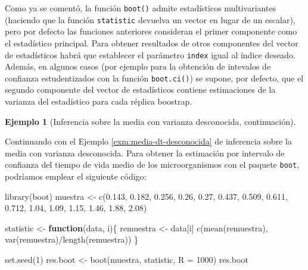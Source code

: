 \documentclass[
]{book}
\newenvironment{Shaded}{\begin{snugshade}}{\end{snugshade}}
\newcommand{\AttributeTok}[1]{\textcolor[rgb]{0.77,0.63,0.00}{#1}}
\newcommand{\ControlFlowTok}[1]{\textcolor[rgb]{0.13,0.29,0.53}{\textbf{#1}}}
\newcommand{\DecValTok}[1]{\textcolor[rgb]{0.00,0.00,0.81}{#1}}
\newcommand{\FloatTok}[1]{\textcolor[rgb]{0.00,0.00,0.81}{#1}}
\newcommand{\FunctionTok}[1]{\textcolor[rgb]{0.00,0.00,0.00}{#1}}
\newcommand{\NormalTok}[1]{#1}
\newcommand{\OtherTok}[1]{\textcolor[rgb]{0.56,0.35,0.01}{#1}}
\newcommand{\SpecialCharTok}[1]{\textcolor[rgb]{0.00,0.00,0.00}{#1}}
\theoremstyle{break}
\theoremstyle{definition}
\theoremstyle{definition}
\newtheorem{example}{Ejemplo}[chapter]
\theoremstyle{definition}
\theoremstyle{definition}
\theoremstyle{remark}
\begin{document}
Como ya se comentó, la función \texttt{boot()} admite estadísticos multivariantes
(haciendo que la función \texttt{statistic} devuelva un vector en lugar de un escalar),
pero por defecto las funciones anteriores consideran el primer componente
como el estadístico principal.
Para obtener resultados de otros componentes del vector de estadísticos
habrá que establecer el parámetro \texttt{index} igual al índice deseado.
Además, en algunos casos (por ejemplo para la obtención de intevalos de confianza
estudentizados con la función \texttt{boot.ci()}) se supone, por defecto, que el segundo
componente del vector de estadísticos contiene estimaciones de la varianza del
estadístico para cada réplica boostrap.

\begin{example}[Inferencia sobre la media con varianza desconocida, continuación]
\protect\hypertarget{exm:media-dt-desconocida-boot}{}{\label{exm:media-dt-desconocida-boot} \iffalse (Inferencia sobre la media con varianza desconocida, continuación) \fi{} } \vspace{0.5cm}

Continuando con el Ejemplo \ref{exm:media-dt-desconocida} de
inferencia sobre la media con varianza desconocida.
Para obtener la estimación por intervalo de confianza del tiempo de vida medio
de los microorganismos con el paquete \texttt{boot}, podríamos emplear
el siguiente código:
\end{example}

\begin{Shaded}
\begin{Highlighting}[]
\FunctionTok{library}\NormalTok{(boot)}
\NormalTok{muestra }\OtherTok{\textless{}{-}} \FunctionTok{c}\NormalTok{(}\FloatTok{0.143}\NormalTok{, }\FloatTok{0.182}\NormalTok{, }\FloatTok{0.256}\NormalTok{, }\FloatTok{0.26}\NormalTok{, }\FloatTok{0.27}\NormalTok{, }\FloatTok{0.437}\NormalTok{, }\FloatTok{0.509}\NormalTok{, }
             \FloatTok{0.611}\NormalTok{, }\FloatTok{0.712}\NormalTok{, }\FloatTok{1.04}\NormalTok{, }\FloatTok{1.09}\NormalTok{, }\FloatTok{1.15}\NormalTok{, }\FloatTok{1.46}\NormalTok{, }\FloatTok{1.88}\NormalTok{, }\FloatTok{2.08}\NormalTok{)}

\NormalTok{statistic }\OtherTok{\textless{}{-}} \ControlFlowTok{function}\NormalTok{(data, i)\{}
\NormalTok{  remuestra }\OtherTok{\textless{}{-}}\NormalTok{ data[i]}
  \FunctionTok{c}\NormalTok{(}\FunctionTok{mean}\NormalTok{(remuestra), }\FunctionTok{var}\NormalTok{(remuestra)}\SpecialCharTok{/}\FunctionTok{length}\NormalTok{(remuestra))}
\NormalTok{\}}

\FunctionTok{set.seed}\NormalTok{(}\DecValTok{1}\NormalTok{)}
\NormalTok{res.boot }\OtherTok{\textless{}{-}} \FunctionTok{boot}\NormalTok{(muestra, statistic, }\AttributeTok{R =} \DecValTok{1000}\NormalTok{)}
\NormalTok{res.boot}
\end{Highlighting}
\end{Shaded}
\end{document}
